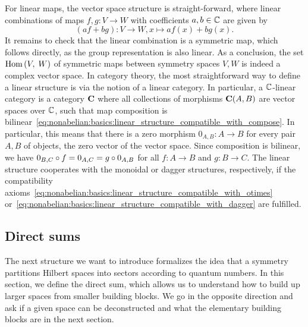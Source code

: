 \begin{doublecol}
    For linear maps, the vector space structure is straight-forward, where linear combinations of maps $f, g : V \to W$ with coefficients $a, b \in \mathbb{C}$ are given by $$(a f + b g): V \to W, x \mapsto a f(x) + b g(x).$$
    It remains to check that the linear combination is a symmetric map, which follows directly, as the group representation is also linear.
    As a conclusion, the set $\mathrm{Hom}\left(V,\; W\right)$ of symmetric maps between symmetry spaces $V, W$ is indeed a complex vector space.
\colswitch
    In category theory, the most straightforward way to define a linear structure is via the notion of a linear category.
    In particular, a $\mathbb{C}$-linear category is a category $\mathbf{C}$ where all collections of morphisms $\mathbf{C}(A, B)$ are vector spaces over $\mathbb{C}$, such that map composition is bilinear~\eqref{eq:nonabelian:basics:linear_structure_compatible_with_compose}.
    In particular, this means that there is a zero morphism $0_{A, B} : A \to B$ for every pair $A, B$ of objects, the zero vector of the vector space.
    Since composition is bilinear, we have $0_{B, C} \circ f = 0_{A, C} = g \circ 0_{A, B}$ for all $f: A \to B$ and $g: B \to C$.
    The linear structure cooperates with the monoidal or dagger structures, respectively, if the compatibility axioms~\eqref{eq:nonabelian:basics:linear_structure_compatible_with_otimes} or~\eqref{eq:nonabelian:basics:linear_structure_compatible_with_dagger} are fulfilled.
\end{doublecol}



\subsection{Direct sums}
\label{subsec:nonablian:basics:direct_sums}

The next structure we want to introduce formalizes the idea that a symmetry partitions Hilbert spaces into sectors according to quantum numbers.
%
In this section, we define the direct sum, which allows us to understand how to build up larger spaces from smaller building blocks.
%
We go in the opposite direction and ask if a given space can be deconstructed and what the elementary building blocks are in the next section.

